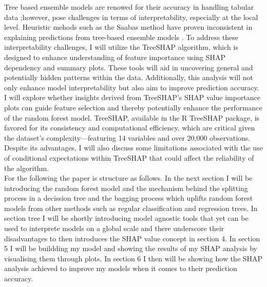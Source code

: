 \documentclass[12pt]{article}
\begin{document}
Tree based ensemble models are renowed for their accuracy in handling tabular data \cite{Chen_2016} \cite{grinsztajn2022treebased} \cite{lundberg2019explainable};however, pose challenges in terms of interpretability, especially at the local level.
 Heuristic mehods such as the Saabas method have proven inconsistent in explaining predictions from tree-based ensemble models \cite{lundberg2019consistent}.
To address these interpretability challenges, I will utilize the TreeSHAP algorithm, which is designed to enhance understanding of feature importance using SHAP dependency and summary plots. These tools will aid in uncovering general and potentially hidden patterns within the data.
Additionally, this analysis will not only enhance model interpretability but also aim to improve prediction accuracy. I will explore whether insights derived from TreeSHAP's SHAP value importance plots can guide feature selection and thereby potentially enhance the performance of the random forest model.
TreeSHAP, available in the R TreeSHAP package, is favored for its consistency and computational efficiency, which are critical given the dataset's complexity—featuring 14 variables and over 20,000 observations. Despite its advantages, I will also discuss some limitations associated with the use of conditional expectations within TreeSHAP that could affect the reliability of the algorithm.\\
For the following the paper is structure as follows. In the next section I will be introducing the random forest model and the mechanism behind the splitting process in a decission tree and the bagging process which uplifts random forest models from other methods such as regular classification and regression trees. In section tree I will be shortly introducing model agnostic tools that yet can be used to interprete models on a global scale and there underscore their disadvantages to then introduces the SHAP value concept in section 4. In section 5 I will be buildding my model and showing the results of my SHAP analysis by visualising them through plots. In section 6 I then will be showing how the SHAP analysis achieved to improve my models when it comes to their prediction accuracy. 
\end{document}
